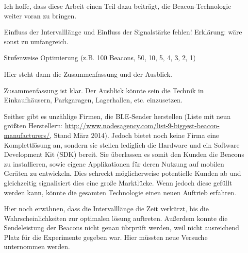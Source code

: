 Ich hoffe, dass diese Arbeit einen Teil dazu beiträgt, die Beacon-Technologie weiter voran zu bringen. 

Einfluss der Intervalllänge und Einfluss der Signalstärke fehlen! Erklärung: wäre sonst zu umfangreich.

Stufenweise Optimierung (z.B. 100 Beacons, 50, 10, 5, 4, 3, 2, 1)

Hier steht dann die Zusammenfassung und der Ausblick.


Zusammenfassung ist klar. Der Ausblick könnte sein die Technik in Einkaufhäusern, Parkgaragen, Lagerhallen, etc. einzusetzen. 

Seither gibt es unzählige Firmen, die BLE-Sender herstellen (Liste mit neun größten Herstellern: \url{http://www.nodesagency.com/list-9-biggest-beacon-manufacturers/}, Stand März 2014). Jedoch bietet noch keine Firma eine Komplettlösung an, sondern sie stellen lediglich die Hardware und ein Software Development Kit (SDK) bereit. Sie überlassen es somit den Kunden die Beacons zu installieren, sowie eigene Applikationen für deren Nutzung auf mobilen Geräten zu entwickeln. Dies schreckt möglicherweise potentielle Kunden ab und gleichzeitig signalisiert dies eine große Marktlücke. Wenn jedoch diese gefüllt werden kann, könnte die gesamten Technologie einen neuen Auftrieb erfahren.

Hier noch erwähnen, dass die Intervalllänge die Zeit verkürzt, bis die Wahrscheinlichkeiten zur optimalen lösung auftreten. Außerdem konnte die Sendeleistung der Beacons nicht genau übrprüft werden, weil nicht ausreichend Platz für die Experimente gegeben war. Hier müssten neue Versuche unternommen werden.